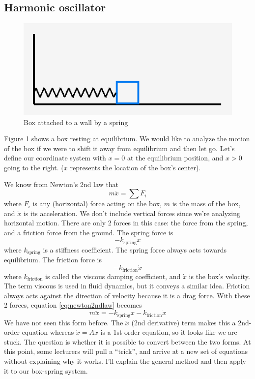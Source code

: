 \documentclass[11pt, oneside]{article}   	%
\begin{document}
\subsection*{Harmonic oscillator}

\begin{figure}[h]
\centering
\includegraphics[scale=0.5]{boxspring}
\caption{Box attached to a wall by a spring}
\label{fig:BoxSpring}
\end{figure}

Figure \ref{fig:BoxSpring} shows a box resting at equilibrium.
We would like to analyze the motion of the box if we were to shift it away from equilibrium and then let go.
Let's define our coordinate system with $x = 0$ at the equilibrium position, and $x > 0$ going to the right.
($x$ represents the location of the box's center).

We know from Newton's 2nd law that
\begin{equation} \label{eq:newton2ndlaw}
m \ddot{x} = \sum F_i
\end{equation}
where $F_i$ is any (horizontal) force acting on the box, $m$ is the mass of the box, and $\ddot{x}$ is its acceleration.
We don't include vertical forces since we're analyzing horizontal motion.
There are only 2 forces in this case: the force from the spring, and a friction force from the ground.
The spring force is
\begin{equation}
  -k_\mathrm{spring} x
\end{equation}
where $k_\mathrm{spring}$ is a stiffness coefficient.
The spring force always acts towards equilibrium.
The friction force is
\begin{equation}
  -k_\mathrm{friction} \dot{x}
\end{equation}
where $k_\mathrm{friction}$ is called the viscous damping coefficient, and $\dot{x}$ is the box's velocity.
The term viscous is used in fluid dynamics, but it conveys a similar idea.
Friction always acts against the direction of velocity because it is a drag force.
With these 2 forces, equation \ref*{eq:newton2ndlaw} becomes
\begin{equation} \label{eq:boxeq}
  m \ddot{x} =
  -k_\mathrm{spring} x
  -k_\mathrm{friction} \dot{x}
\end{equation}
We have not seen this form before.
The $\ddot{x}$ (2nd derivative) term makes this a 2nd-order equation whereas $\dot{x} = Ax$ is a 1st-order equation, so it looks like we are stuck.
The question is whether it is possible to convert between the two forms.
At this point, some lecturers will pull a ``trick'', and arrive at a new set of equations without explaining why it works.
I'll explain the general method and then apply it to our box-spring system.
\end{document}
